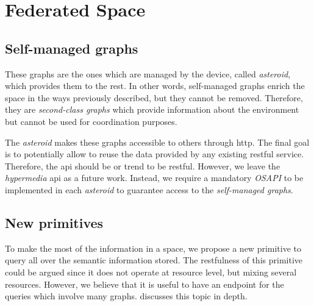 \section{Federated Space}
\label{sec:halfway_solution}

\subsection{Self-managed graphs}

These graphs are the ones which are managed by the device, called \emph{asteroid}, which provides them to the rest.
In other words, self-managed graphs enrich the space in the ways previously described, but they cannot be removed.
Therefore, they are \emph{second-class graphs} which provide information about the environment but cannot be used for coordination purposes.

The \emph{asteroid} makes these graphs accessible to others through \ac{http}.
The final goal is to potentially allow to reuse the data provided by any existing \ac{rest}ful service. %
Therefore, the \ac{api} should be or trend to be \ac{rest}ful.
However, we leave the \emph{hypermedia} \ac{api} as a future work.
Instead, we require a mandatory \emph{OSAPI} to be implemented in each \emph{asteroid} to guarantee access to the \emph{self-managed graphs}.



\subsection{New primitives}

To make the most of the information in a space, we propose a new primitive to query all over the semantic information stored.
The \ac{rest}fulness of this primitive could be argued since it does not operate at resource level, but mixing several resources.
However, we believe that it is useful to have an endpoint for the queries which involve many graphs.
\citet{kjernsmo_necessity_2012} discusses this topic in depth. %

